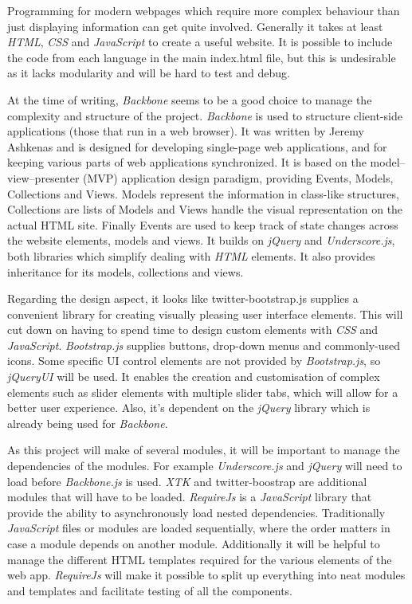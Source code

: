 \documentclass[a4paper,11pt,titlepage]{article}
\begin{document}
Programming for modern webpages which require more complex behaviour than just displaying information can get quite involved. Generally it takes at least \textit{HTML}, \textit{CSS} and \textit{JavaScript} to create a useful website. It is possible to include the code from each language in the main index.html file, but this is undesirable as it lacks modularity and will be hard to test and debug.

At the time of writing, \textit{Backbone} seems to be a good choice to manage the complexity and structure of the project. \textit{Backbone} is used to structure client-side applications (those that run in a web browser). It was written by Jeremy Ashkenas and is designed for developing single-page web applications, and for keeping various parts of web applications synchronized. It is based on the model–view–presenter (MVP) application design paradigm, providing Events, Models, Collections and Views. Models represent the information in class-like structures, Collections are lists of Models and Views handle the visual representation on the actual HTML site. Finally Events are used to keep track of state changes across the website elements, models and views. It builds on \textit{jQuery} and \textit{Underscore.js}, both libraries which simplify dealing with \textit{HTML} elements. It also provides inheritance for its models, collections and views.

Regarding the design aspect, it looks like twitter-bootstrap.js supplies a convenient library for creating visually pleasing user interface elements. This will cut down on having to spend time to design custom elements with \textit{CSS} and \textit{JavaScript}. \textit{Bootstrap.js} supplies buttons, drop-down menus and commonly-used icons. Some specific UI control elements are not provided by \textit{Bootstrap.js}, so \textit{jQueryUI} will be used. It enables the creation and customisation of complex elements such as slider elements with multiple slider tabs, which will allow for a better user experience. Also, it's dependent on the \textit{jQuery} library which is already being used for \textit{Backbone}.

As this project will make of several modules, it will be important to manage the dependencies of the modules. For example \textit{Underscore.js} and \textit{jQuery} will need to load before \textit{Backbone.js} is used. \textit{XTK} and twitter-boostrap are additional modules that will have to be loaded. \textit{RequireJs} is a \textit{JavaScript} library that provide the ability to asynchronously load nested dependencies. Traditionally \textit{JavaScript} files or modules are loaded sequentially, where the order matters in case a module depends on another module. Additionally it will be helpful to manage the different HTML templates required for the various elements of the web app. \textit{RequireJs} will make it possible to split up everything into neat modules and templates and facilitate testing of all the components.
\end{document}
